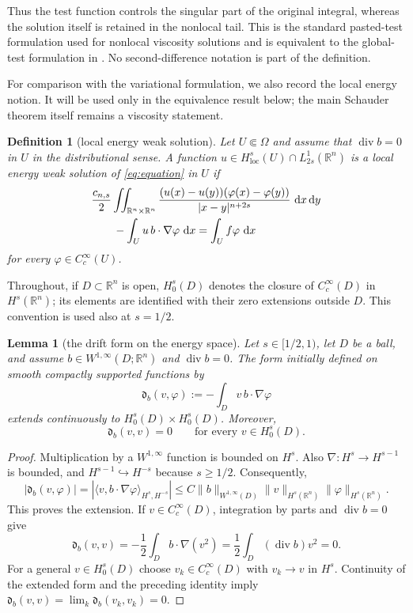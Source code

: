 \documentclass[10pt,a4paper]{amsart}
\numberwithin{equation}{section}
\newtheorem{lemma}[theorem]{Lemma}
\newtheorem{definition}[theorem]{Definition}
\newcommand{\R}{\mathbb R}
\newcommand{\differential}{\mathop{}\!\mathrm d}
\DeclareMathOperator{\divergence}{div}
\begin{document}
Thus the test function controls the singular part of the original integral,
whereas the solution itself is retained in the nonlocal tail.  This is the
standard pasted-test formulation used for nonlocal viscosity solutions and
is equivalent to the global-test formulation in
\cite[Section~3]{Silvestre2012Diff}.  No second-difference notation is part
of the definition.

For comparison with the variational formulation, we also record the local
energy notion.  It will be used only in the equivalence result below; the
main Schauder theorem itself remains a viscosity statement.

\begin{definition}[local energy weak solution]\label{def:weak}
Let $U\Subset\Omega$ and assume that $\divergence b=0$ in $U$ in the
distributional sense.  A function
$u\in H^{s}_{\mathrm{loc}}(U)\cap L^1_{2s}(\R^n)$ is a local energy weak
solution of \eqref{eq:equation} in $U$ if
\begin{align}\label{eq:weak-form}
 &\frac{c_{n,s}}2\iint_{\R^n\times\R^n}
 \frac{(u(x)-u(y))(\varphi(x)-\varphi(y))}{|x-y|^{n+2s}}
 \,\differential x\differential y\notag\\
 &\qquad-\int_U u\,b\cdot\nabla\varphi\,\differential x
 =\int_U f\varphi\,\differential x
\end{align}
for every $\varphi\in C_c^\infty(U)$.
\end{definition}

Throughout, if $D\subset\R^n$ is open, $H_0^s(D)$ denotes the closure of
$C_c^\infty(D)$ in $H^s(\R^n)$; its elements are identified with their zero
extensions outside $D$.  This convention is used also at $s=1/2$.

\begin{lemma}[the drift form on the energy space]
\label{lem:drift-form}
Let $s\in[1/2,1)$, let $D$ be a ball, and assume
$b\in W^{1,\infty}(D;\R^n)$ and $\divergence b=0$.  The form initially
defined on smooth compactly supported functions by
\[
 \mathfrak d_b(v,\varphi):=-\int_D v\,b\cdot\nabla\varphi
\]
extends continuously to $H_0^s(D)\times H_0^s(D)$.  Moreover,
\begin{equation}\label{eq:drift-cancellation}
 \mathfrak d_b(v,v)=0\qquad\text{for every }v\in H_0^s(D).
\end{equation}
\end{lemma}

\begin{proof}
Multiplication by a $W^{1,\infty}$ function is bounded on $H^s$.  Also
$\nabla:H^s\to H^{s-1}$ is bounded, and $H^{s-1}\hookrightarrow H^{-s}$
because $s\ge1/2$.  Consequently,
\[
 |\mathfrak d_b(v,\varphi)|
 =|\langle v,b\cdot\nabla\varphi\rangle_{H^s,H^{-s}}|
 \le C\|b\|_{W^{1,\infty}(D)}
       \|v\|_{H^s(\R^n)}\|\varphi\|_{H^s(\R^n)}.
\]
This proves the extension.  If $v\in C_c^\infty(D)$, integration by parts
and $\divergence b=0$ give
\[
 \mathfrak d_b(v,v)=-\frac12\int_D b\cdot\nabla(v^2)
 =\frac12\int_D(\divergence b)v^2=0.
\]
For a general $v\in H_0^s(D)$ choose $v_k\in C_c^\infty(D)$ with
$v_k\to v$ in $H^s$.  Continuity of the extended form and the preceding
identity imply
$\mathfrak d_b(v,v)=\lim_k\mathfrak d_b(v_k,v_k)=0$.
\end{proof}
\end{document}
